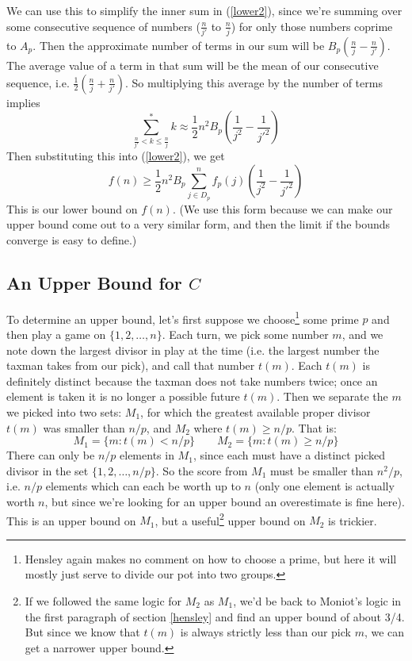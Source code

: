 \documentclass[a4paper,10pt]{amsart} %
\begin{document}
We can use this to simplify the inner sum in (\ref{lower2}), since we're summing over some consecutive sequence of numbers ($\frac{n}{j'}$ to $\frac{n}{j}$) for only those numbers coprime to $A_p$. Then the approximate number of terms in our sum will be $B_p (\frac{n}{j} -\frac{n}{j'})$. The average value of a term in that sum will be the mean of our consecutive sequence, i.e. $\frac{1}{2} (\frac{n}{j} + \frac{n}{j'})$. So multiplying this average by the number of terms implies
\begin{equation} \label{sumk}
    \sum_{\frac{n}{j'} < k \leq \frac{n}{j}}^* k \approx \frac{1}{2} n^2 B_p (\frac{1}{j^2} - \frac{1}{j'^2})
\end{equation}
Then substituting this into (\ref{lower2}), we get
\begin{equation} \label{lower3}
    f(n) \geq \frac{1}{2} n^2 B_p \sum_{j \in D_p}^n f_p(j) (\frac{1}{j^2} - \frac{1}{j'^2})
\end{equation}
This is our lower bound on $f(n)$. (We use this form because we can make our upper bound come out to a very similar form, and then the limit if the bounds converge is easy to define.)

\subsection{An Upper Bound for $C$} \label{upperbound}
To determine an upper bound, let's first suppose we choose\footnote{Hensley again makes no comment on how to choose a prime, but here it will mostly just serve to divide our pot into two groups.} some prime $p$ and then play a game on $\{1, 2, \dots, n \}$. Each turn, we pick some number $m$, and we note down the largest divisor in play at the time (i.e. the largest number the taxman takes from our pick), and call that number $t(m)$. Each $t(m)$ is definitely distinct because the taxman does not take numbers twice; once an element is taken it is no longer a possible future $t(m)$. Then we separate the $m$ we picked into two sets: $M_1$, for which the greatest available proper divisor $t(m)$ was smaller than $n / p$, and $M_2$ where $t(m) \geq n / p$. That is:
\begin{equation*}
    M_1 = \{m : t(m) < n/p \} \qquad M_2 = \{m: t(m) \geq n/p \}
\end{equation*}
There can only be $n/p$ elements in $M_1$, since each must have a distinct picked divisor in the set $\{1, 2, \dots, n/p \}$. So the score from $M_1$ must be smaller than $n^2/p$, i.e. $n/p$ elements which can each be worth up to $n$ (only one element is actually worth $n$, but since we're looking for an upper bound an overestimate is fine here). This is an upper bound on $M_1$, but a useful\footnote{If we followed the same logic for $M_2$ as $M_1$, we'd be back to Moniot's logic in the first paragraph of section \ref{hensley} and find an upper bound of about 3/4. But since we know that $t(m)$ is always strictly less than our pick $m$, we can get a narrower upper bound.} upper bound on $M_2$ is trickier. 
\end{document}
